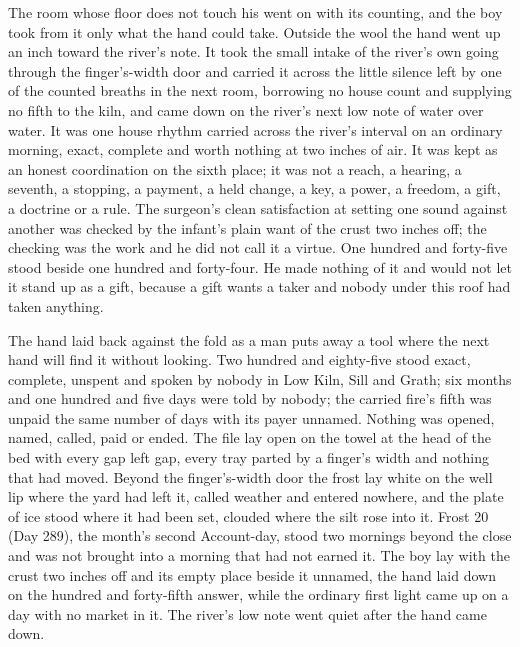 The room whose floor does not touch his went on with its counting, and the boy took from it only what the hand could take. Outside the wool the hand went up an inch toward the river's note. It took the small intake of the river's own going through the finger's-width door and carried it across the little silence left by one of the counted breaths in the next room, borrowing no house count and supplying no fifth to the kiln, and came down on the river's next low note of water over water. It was one house rhythm carried across the river's interval on an ordinary morning, exact, complete and worth nothing at two inches of air. It was kept as an honest coordination on the sixth place; it was not a reach, a hearing, a seventh, a stopping, a payment, a held change, a key, a power, a freedom, a gift, a doctrine or a rule. The surgeon's clean satisfaction at setting one sound against another was checked by the infant's plain want of the crust two inches off; the checking was the work and he did not call it a virtue. One hundred and forty-five stood beside one hundred and forty-four. He made nothing of it and would not let it stand up as a gift, because a gift wants a taker and nobody under this roof had taken anything.

The hand laid back against the fold as a man puts away a tool where the next hand will find it without looking. Two hundred and eighty-five stood exact, complete, unspent and spoken by nobody in Low Kiln, Sill and Grath; six months and one hundred and five days were told by nobody; the carried fire's fifth was unpaid the same number of days with its payer unnamed. Nothing was opened, named, called, paid or ended. The file lay open on the towel at the head of the bed with every gap left gap, every tray parted by a finger's width and nothing that had moved. Beyond the finger's-width door the frost lay white on the well lip where the yard had left it, called weather and entered nowhere, and the plate of ice stood where it had been set, clouded where the silt rose into it. Frost 20 (Day 289), the month's second Account-day, stood two mornings beyond the close and was not brought into a morning that had not earned it. The boy lay with the crust two inches off and its empty place beside it unnamed, the hand laid down on the hundred and forty-fifth answer, while the ordinary first light came up on a day with no market in it. The river's low note went quiet after the hand came down.

